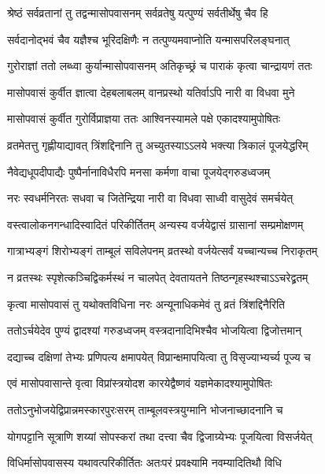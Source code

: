 \twolineshloka
{श्रेष्ठं सर्वव्रतानां तु तद्वन्मासोपवासनम्}
{सर्वव्रतेषु यत्पुण्यं सर्वतीर्थेषु चैव हि} %

\twolineshloka
{सर्वदानोद्भवं चैव यज्ञैश्च भूरिदक्षिणैः}
{न तत्पुण्यमवाप्नोति यन्मासपरिलङ्घनात्} %

\twolineshloka
{गुरोराज्ञां ततो लब्ध्वा कुर्यान्मासोपवासनम्}
{अतिकृच्छ्रं च पाराकं कृत्वा चान्द्रायणं ततः} %

\twolineshloka
{मासोपवासं कुर्वीत ज्ञात्वा देहबलाबलम्}
{वानप्रस्थो यतिर्वाऽपि नारी वा विधवा मुने} %

\twolineshloka
{मासोपवासं कुर्वीत गुरोर्विप्राज्ञया ततः}
{आश्विनस्यामले पक्षे एकादश्यामुपोषितः} %

\twolineshloka
{व्रतमेतत्तु गृह्णीयाद्यावत् त्रिंशद्दिनानि तु}
{अच्युतस्याऽऽलये भक्त्या त्रिकालं पूजयेद्धरिम्} %

\twolineshloka
{नैवेद्यधूपदीपाद्यैः पुष्पैर्नानाविधैरपि}
{मनसा कर्मणा वाचा पूजयेद्गरुडध्वजम्} %

\twolineshloka
{नरः स्वधर्मनिरतः सधवा च जितेन्द्रिया}
{नारी वा विधवा साध्वी वासुदेवं समर्चयेत्} %

\twolineshloka
{वस्त्वालोकनगन्धादिस्वादितं परिकीर्तितम्}
{अन्यस्य वर्जयेद्वासं ग्रासानां सम्प्रमोक्षणम्} %

\twolineshloka
{गात्राभ्यङ्गं शिरोभ्यङ्गं ताम्बूलं सविलेपनम्}
{व्रतस्थो वर्जयेत्सर्वं यच्चान्यच्च निराकृतम्} %

\twolineshloka
{न व्रतस्थः स्पृशेत्कञ्चिद्विकर्मस्थं न चालपेत्}
{देवतायतने तिष्ठन्गृहस्थश्चाऽऽचरेद्व्रतम्} %

\twolineshloka
{कृत्वा मासोपवासं तु यथोक्तविधिना नरः}
{अन्यूनाधिकमेवं तु व्रतं त्रिंशद्दिनैरिति} %

\twolineshloka
{ततोऽर्चयेदेव पुण्यं द्वादश्यां गरुडध्वजम्}
{वस्त्रदानादिभिश्चैव भोजयित्वा द्विजोत्तमान्} %

\twolineshloka
{दद्याच्च दक्षिणां तेभ्यः प्रणिपत्य क्षमापयेत्}
{विप्रान्क्षमापयित्वा तु विसृज्याभ्यर्च्य पूज्य च} %

\twolineshloka
{एवं मासोपवासान्ते वृत्वा विप्रांस्त्रयोदश}
{कारयेद्वैष्णवं यज्ञमेकादश्यामुपोषितः} %

\twolineshloka
{ततोऽनुभोजयेद्विप्रान्नमस्कारपुरःसरम्}
{ताम्बूलवस्त्रयुग्मानि भोजनाच्छादनानि च} %

\twolineshloka
{योगपट्टानि सूत्राणि शय्यां सोपस्करां तथा}
{दत्त्वा चैव द्विजाग्र्येभ्यः पूजयित्वा विसर्जयेत्} %

\twolineshloka
{विधिर्मासोपवासस्य यथावत्परिकीर्तितः}
{अतःपरं प्रवक्ष्यामि नवम्यादितिथौ विधि} %


